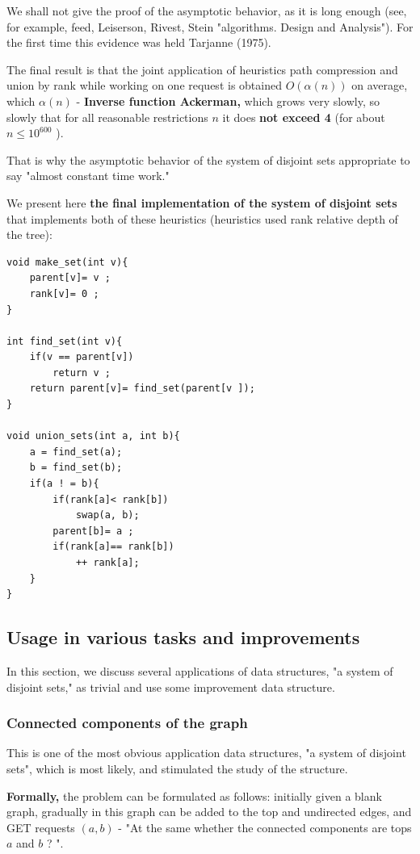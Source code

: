 We shall not give the proof of the asymptotic behavior, as it is long enough (see, for example, feed, Leiserson, Rivest, Stein "algorithms. Design and Analysis"). For the first time this evidence was held Tarjanne (1975).

The final result is that the joint application of heuristics path compression and union by rank while working on one request is obtained $O (\alpha (n))$ on average, which $\alpha (n)$ - \textbf{Inverse function Ackerman,} which grows very slowly, so slowly that for all reasonable restrictions $n$ it does \textbf{not exceed 4} (for about $n \le 10 ^ {600}$ ).

That is why the asymptotic behavior of the system of disjoint sets appropriate to say "almost constant time work."

We present here \textbf{the final implementation of the system of disjoint sets} that implements both of these heuristics (heuristics used rank relative depth of the tree):

\begin{verbatim}
void make_set(int v){
    parent[v]= v ;
    rank[v]= 0 ;
}
 
int find_set(int v){
    if(v == parent[v])
        return v ;
    return parent[v]= find_set(parent[v ]);
}
 
void union_sets(int a, int b){
    a = find_set(a);
    b = find_set(b);
    if(a ! = b){
        if(rank[a]< rank[b])
            swap(a, b);
        parent[b]= a ;
        if(rank[a]== rank[b])
            ++ rank[a];
    }
} 
\end{verbatim}
\subsection{ Usage in various tasks and improvements }

In this section, we discuss several applications of data structures, "a system of disjoint sets," as trivial and use some improvement data structure.

\subsubsection{ Connected components of the graph }

This is one of the most obvious application data structures, "a system of disjoint sets", which is most likely, and stimulated the study of the structure.

\textbf{Formally,} the problem can be formulated as follows: initially given a blank graph, gradually in this graph can be added to the top and undirected edges, and GET requests $(a, b)$ - "At the same whether the connected components are tops $a$ and $b$ ? ".

